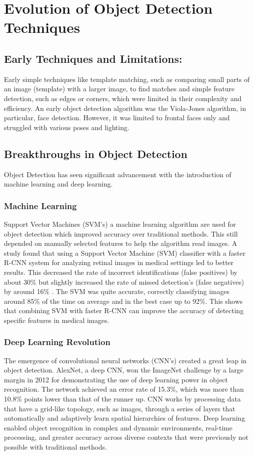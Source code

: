\documentclass[11pt,journal,compsoc]{IEEEtran}
\begin{document}
\section{Evolution of Object Detection Techniques}
\subsection{Early Techniques and Limitations:}
 Early simple techniques like template matching, such as comparing small parts of an image (template) with a larger image, to find matches and simple feature detection, such as edges or corners, which were limited in their complexity and efficiency. An early object detection algorithm was the Viola-Jones algorithm, in particular, face detection. However, it was limited to frontal faces only and struggled with various poses and lighting.\cite{990517}


\subsection{Breakthroughs in Object Detection}
Object Detection has seen significant advancement with the introduction of machine learning and deep learning. 
\subsubsection{Machine Learning}
Support Vector Machines (SVM's) a machine learning algorithm are used for object detection which improved accuracy over traditional methods. This still depended on manually selected features to help the algorithm read images. A study found that using a Support Vector Machine (SVM) classifier with a faster R-CNN system for analyzing retinal images in medical settings led to better results. This decreased the rate of incorrect identifications (false positives) by about 30\% but slightly increased the rate of missed detection's (false negatives) by around 16\% \cite{kurilova2021support}. The SVM was quite accurate, correctly classifying images around 85\% of the time on average and in the best case up to 92\%\cite{kurilova2021support}. This shows that combining SVM with faster R-CNN can improve the accuracy of detecting specific features in medical images.
\subsubsection{Deep Learning Revolution}
The emergence of convolutional neural networks (CNN's) created a great leap in object detection. AlexNet, a deep CNN, won the ImageNet challenge by a large margin in 2012 for demonstrating the use of deep learning power in object recognition. The network achieved an error rate of 15.3\%, which was more than 10.8\% points lower than that of the runner up\cite{wiki:alexnet}. CNN works by processing data that have a grid-like topology, such as images, through a series of layers that automatically and adaptively learn spatial hierarchies of features. Deep learning enabled object recognition in complex and dynamic environments, real-time processing, and greater accuracy across diverse contexts that were previously not possible with traditional methods.
\end{document}
